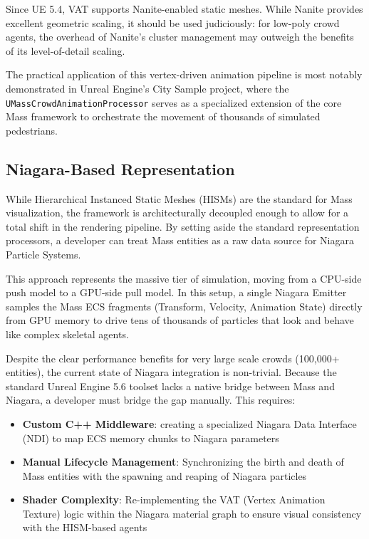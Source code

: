 Since UE 5.4, VAT supports Nanite-enabled static meshes. While Nanite provides excellent geometric scaling, it should be used judiciously: for low-poly crowd agents, the overhead of Nanite’s cluster management may outweigh the benefits of its level-of-detail scaling.

The practical application of this vertex-driven animation pipeline is most notably demonstrated in Unreal Engine’s City Sample project, where the \newline\texttt{UMassCrowdAnimationProcessor} serves as a specialized extension of the core Mass framework to orchestrate the movement of thousands of simulated pedestrians.

\subsection{Niagara-Based Representation}

While Hierarchical Instanced Static Meshes (HISMs) are the standard for Mass visualization, the framework is architecturally decoupled enough to allow for a total shift in the rendering pipeline. By setting aside the standard representation processors, a developer can treat Mass entities as a raw data source for Niagara Particle Systems.

This approach represents the massive tier of simulation, moving from a CPU-side push model to a GPU-side pull model. In this setup, a single Niagara Emitter samples the Mass ECS fragments (Transform, Velocity, Animation State) directly from GPU memory to drive tens of thousands of particles that look and behave like complex skeletal agents.

Despite the clear performance benefits for very large scale crowds (100,000+ entities), the current state of Niagara integration is non-trivial. Because the standard Unreal Engine 5.6 toolset lacks a native bridge between Mass and Niagara, a developer must bridge the gap manually. This requires:

\begin{itemize}
    \item \textbf{Custom C++ Middleware}: creating a specialized Niagara Data Interface (NDI) to map ECS memory chunks to Niagara parameters
    \item \textbf{Manual Lifecycle Management}: Synchronizing the birth and death of Mass entities with the spawning and reaping of Niagara particles
    \item \textbf{Shader Complexity}: Re-implementing the VAT (Vertex Animation Texture) logic within the Niagara material graph to ensure visual consistency with the HISM-based agents
\end{itemize}

